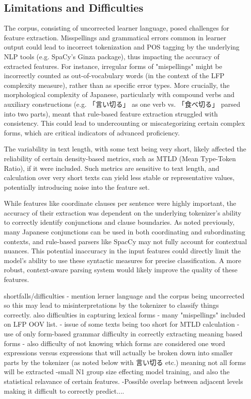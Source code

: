 \subsection{Limitations and Difficulties}
The corpus, consisting of uncorrected learner language, posed challenges for feature extraction. Misspellings and
grammatical errors common in learner output could lead to incorrect tokenization and POS tagging by the underlying
NLP tools (e.g. SpaCy's Ginza package), thus impacting the accuracy of extracted features. For instance, irregular
forms of "mispellings" might be incorrectly counted as out-of-vocabulary words (in the context of the LFP complexity
measure), rather than as specific error types. More crucially, the morphological complexity of Japanese,
particularly with compound verbs and auxiliary constructions (e.g. 「言い切る」 as one verb vs. 「食べ切る」 parsed into two
parts), meant that rule-based feature extraction struggled with consistency. This could lead to undercounting or
miscategorizing certain complex forms, which are critical indicators of advanced proficiency.

The variability in text length, with some text being very short, likely affected the reliability of certain
density-based metrics, such as MTLD (Mean Type-Token Ratio), if it were included. Such metrics are sensitive to text
length, and calculation over very short texts can yield less stable or representative values, potentially
introducing noise into the feature set.

While features like coordinate clauses per sentence were highly important, the accuracy of their extraction was
dependent on the underlying tokenizer's ability to correctly identify conjunctions and clause boundaries. As noted
previously, many Japanese conjunctions can be used in both coordinating and subordinating contexts, and rule-based
parsers like SpacCy may not fully account for contextual nuances. This potential inaccuracy in the input features
could directly limit the model's ability to use these syntactic measures for precise classification. A more robust,
context-aware parsing system would likely improve the quality of these features.



shortfalls/difficulties
- mention lerner language and the corpus being uncorrected so this may lead to misinterpretations by the tokenizer to classify things correctly.
    also difficulties in capturing lexical forms - many "mispellings" included on LFP OOV list.
- issue of some texts being too short for MTLD calculation
- use of only form-based grammar difficulty in correctly extracting meaning based forms
- also difficulty of not knowing which forms are considered one word expressions versus expressions that will
actually be broken down into smaller parts by the tokenizer (as noted below with 言い切る etc.) meaning not all forms
will be extracted
-small N1 group size effecting model training, and also the statistical relavance of certain features.
-Possible overlap between adjacent levels making it difficult to correctly predict....

